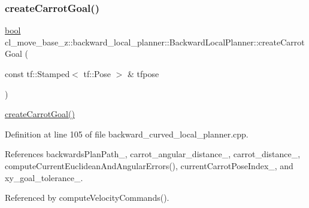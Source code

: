 \mbox{\label{classcl__move__base__z_1_1backward__local__planner_1_1BackwardLocalPlanner_a786337a838e58b38b724bc342cf76e10}} 
\subsubsection{\texorpdfstring{create\+Carrot\+Goal()}{createCarrotGoal()}}
{\footnotesize\ttfamily \hyperlink{classbool}{bool} cl\+\_\+move\+\_\+base\+\_\+z\+::backward\+\_\+local\+\_\+planner\+::\+Backward\+Local\+Planner\+::create\+Carrot\+Goal (\begin{DoxyParamCaption}\item[{const tf\+::\+Stamped$<$ tf\+::\+Pose $>$ \&}]{tfpose }\end{DoxyParamCaption})\hspace{0.3cm}{\ttfamily [private]}}

\hyperlink{classcl__move__base__z_1_1backward__local__planner_1_1BackwardLocalPlanner_a786337a838e58b38b724bc342cf76e10}{create\+Carrot\+Goal()} 

Definition at line 105 of file backward\+\_\+curved\+\_\+local\+\_\+planner.\+cpp.



References backwards\+Plan\+Path\+\_\+, carrot\+\_\+angular\+\_\+distance\+\_\+, carrot\+\_\+distance\+\_\+, compute\+Current\+Euclidean\+And\+Angular\+Errors(), current\+Carrot\+Pose\+Index\+\_\+, and xy\+\_\+goal\+\_\+tolerance\+\_\+.



Referenced by compute\+Velocity\+Commands().


